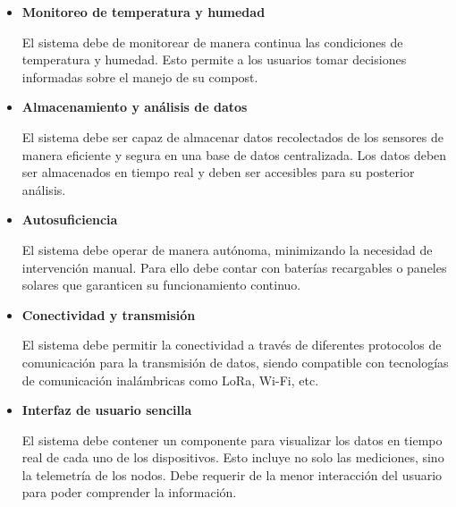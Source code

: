 \begin{itemize}
    \item \textbf{Monitoreo de temperatura y humedad}
    
    El sistema debe de monitorear de manera continua las condiciones de temperatura y humedad. Esto permite a los usuarios tomar decisiones informadas sobre el manejo de su compost.

    \item \textbf{Almacenamiento y análisis de datos}
    
    El sistema debe ser capaz de almacenar datos recolectados de los sensores  de manera eficiente y segura en una base de datos centralizada. Los datos deben ser almacenados en tiempo real y deben ser accesibles para su posterior análisis.

    \item \textbf{Autosuficiencia}
    
    El sistema debe operar de manera autónoma, minimizando la necesidad de intervención manual. Para ello debe contar con baterías recargables o paneles solares que garanticen su funcionamiento continuo.

    \item \textbf{Conectividad y transmisión}
    
    El sistema debe permitir la conectividad a través de diferentes protocolos de comunicación para la transmisión de datos, siendo compatible con tecnologías de comunicación inalámbricas como LoRa, Wi-Fi, etc.

    \item \textbf{Interfaz de usuario sencilla}
    
    El sistema debe contener un componente para visualizar los datos en tiempo real de cada uno de los dispositivos. Esto incluye no solo las mediciones, sino la telemetría de los nodos. Debe requerir de la menor interacción del usuario para poder comprender la información.
    

\end{itemize}
\newpage

